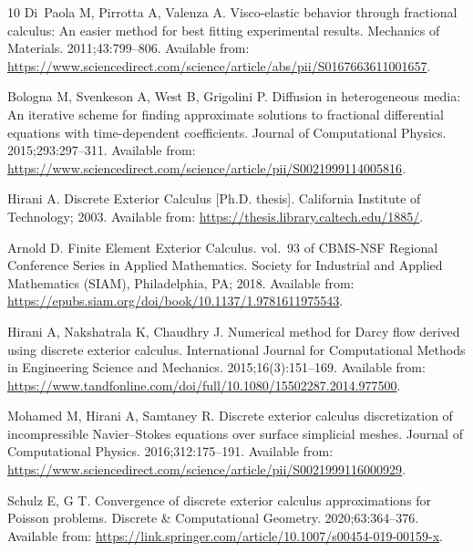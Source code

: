 \documentclass{elsarticle}
\theoremstyle{definition}
\begin{document}
\begin{thebibliography}{10}
Di~Paola M, Pirrotta A, Valenza A.
\newblock Visco-elastic behavior through fractional calculus: An easier method
  for best fitting experimental results.
\newblock Mechanics of Materials. 2011;43:799–806.
\newblock Available from:
  \url{https://www.sciencedirect.com/science/article/abs/pii/S0167663611001657}.

Bologna M, Svenkeson A, West B, Grigolini P.
\newblock Diffusion in heterogeneous media: An iterative scheme for finding
  approximate solutions to fractional differential equations with
  time-dependent coefficients.
\newblock Journal of Computational Physics. 2015;293:297–311.
\newblock Available from:
  \url{https://www.sciencedirect.com/science/article/pii/S0021999114005816}.

Hirani A.
\newblock Discrete Exterior Calculus [Ph.D. thesis].
\newblock California Institute of Technology; 2003.
\newblock Available from: \url{https://thesis.library.caltech.edu/1885/}.

Arnold D.
\newblock Finite Element Exterior Calculus. vol.~93 of CBMS-NSF Regional
  Conference Series in Applied Mathematics.
\newblock Society for Industrial and Applied Mathematics (SIAM), Philadelphia,
  PA; 2018.
\newblock Available from:
  \url{https://epubs.siam.org/doi/book/10.1137/1.9781611975543}.

Hirani A, Nakshatrala K, Chaudhry J.
\newblock Numerical method for Darcy flow derived using discrete exterior
  calculus.
\newblock International Journal for Computational Methods in Engineering
  Science and Mechanics. 2015;16(3):151--169.
\newblock Available from:
  \url{https://www.tandfonline.com/doi/full/10.1080/15502287.2014.977500}.

Mohamed M, Hirani A, Samtaney R.
\newblock Discrete exterior calculus discretization of incompressible
  Navier–Stokes equations over surface simplicial meshes.
\newblock Journal of Computational Physics. 2016;312:175--191.
\newblock Available from:
  \url{https://www.sciencedirect.com/science/article/pii/S0021999116000929}.

Schulz E, G T.
\newblock Convergence of discrete exterior calculus approximations for Poisson
  problems.
\newblock Discrete \& Computational Geometry. 2020;63:364--376.
\newblock Available from:
  \url{https://link.springer.com/article/10.1007/s00454-019-00159-x}.


\end{thebibliography}
\end{document}
